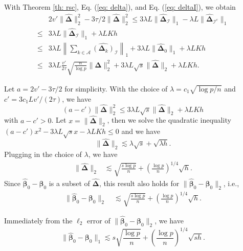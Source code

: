 \documentclass[twoside,12pt]{article}
\newcommand{\mb}[1]{\boldsymbol{\mathbf{#1}}}
\newcommand{\wh}[1]{\widehat{#1}}
\begin{document}
With Theorem \ref{th: rsc}, Eq. (\ref{eq: delta}), and Eq. (\ref{eq: deltaI}), we obtain
\begin{equation*}
	\begin{aligned}
		&2v'\|\wh{\mb\Delta}\|_2^2-3\tau/2\| \wh{\mb\Delta}\|_2^2\leq 3 \lambda L\|\wh{\mb\Delta}_{\mathcal I}\|_1-\lambda L \|\wh{\mb\Delta}_{\mathcal I^c}\|_1\\
		\leq & 3 \lambda L\|\wh{\mb\Delta}_{\mathcal I}\|_1+\lambda LKh\\
		\leq & 3 \lambda L\left\|\sum_{k\in\mathcal A}\wh{(\mb\Delta_k)}_{\mathcal I}\right\|_1+3 \lambda L\|\wh{\mb\Delta}_0\|_1+\lambda LKh\\
		\leq & 3\lambda L\frac{v'}{2\tau}\sqrt{\frac n{\log p}} \|\wh{\mb\Delta}\|_2^2+3\lambda L\sqrt{s}\|\wh{\mb\Delta}\|_2+\lambda LKh.
	\end{aligned}
\end{equation*}

Let $a=2v'-3\tau/2$ for simplicity.
With the choice of $\lambda=c_1 \sqrt{\log p/n}$ and $c'=3c_1 Lv'/(2\tau)$, we have
\begin{equation*}
	(a-c')\|\wh{\mb\Delta}\|_2^2\leq 3\lambda L\sqrt{s}\|\wh{\mb\Delta}\|_2+ \lambda LKh
\end{equation*}
with $a-c'> 0$.
Let $x=\|\wh{\mb\Delta}\|_2$, then we solve the quadratic inequality $(a-c')x^2-3\lambda L\sqrt{s} x-\lambda LKh\leq 0$ and we have
$$\|\wh{\mb\Delta}\|_2\lesssim \lambda\sqrt{s}+\sqrt{\lambda h}.$$
Plugging in the choice of $\lambda$, we have 
\begin{equation*}
	\begin{aligned}
		\|\wh{\mb\Delta}\|_2
		&\lesssim \sqrt{\frac{s\log p}{n}}+\left(\frac{\log p}{n}\right)^{1/4}\sqrt{h}.
	\end{aligned}
\end{equation*}
Since $\wh{\mb\beta}_0-\mb\beta_0$ is a subset of $\wh{\mb\Delta}$, this result also holds for $\|\wh{\mb\beta}_0-\mb\beta_0\|_2$, i.e.,
\begin{equation*}
	\begin{aligned}
		\|\wh{\mb\beta}_0-\mb\beta_0\|_2\
		&\lesssim \sqrt{\frac{s\log p}{n}}+\left(\frac{\log p}{n}\right)^{1/4}\sqrt{h}.
	\end{aligned}
\end{equation*}

Immediately from the $\ell_2$ error of $\|\wh{\mb\beta}_0-\mb\beta_0\|_2$, we have
$$\|\wh{\mb\beta}_0-\mb\beta_0\|_1\lesssim s\sqrt{\frac{\log p}{n}}+\left(\frac{\log p}{n}\right)^{1/4}\sqrt{sh}.$$
\end{document}

